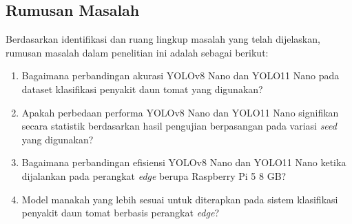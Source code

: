 \begin{sectioncontent}
    \subsection{Rumusan Masalah}
    \begin{subsectioncontent}
        \hspace{\parindent}Berdasarkan identifikasi dan ruang lingkup masalah yang telah dijelaskan, rumusan masalah dalam penelitian ini adalah sebagai berikut:

        \begin{enumerate}[leftmargin=0.75cm,label=\arabic*.]
            \item Bagaimana perbandingan akurasi YOLOv8 Nano dan YOLO11 Nano pada dataset klasifikasi penyakit daun tomat yang digunakan?
            \item Apakah perbedaan performa YOLOv8 Nano dan YOLO11 Nano signifikan secara statistik berdasarkan hasil pengujian berpasangan pada variasi \textit{seed} yang digunakan?
            \item Bagaimana perbandingan efisiensi YOLOv8 Nano dan YOLO11 Nano ketika dijalankan pada perangkat \textit{edge} berupa Raspberry Pi 5 8 GB?
            \item Model manakah yang lebih sesuai untuk diterapkan pada sistem klasifikasi penyakit daun tomat berbasis perangkat \textit{edge}?
        \end{enumerate}
    \end{subsectioncontent}
\end{sectioncontent}

